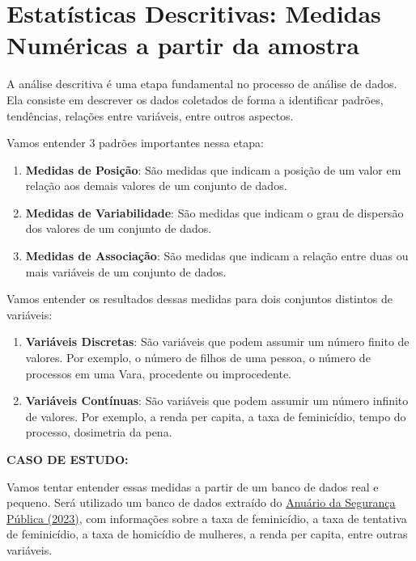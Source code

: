 \documentclass[
  letterpaper,
  DIV=11,
  numbers=noendperiod]{scrreprt}
\begin{document}
\section{Estatísticas Descritivas: Medidas Numéricas a partir da
amostra}\label{estatuxedsticas-descritivas-medidas-numuxe9ricas-a-partir-da-amostra}

A análise descritiva é uma etapa fundamental no processo de análise de
dados. Ela consiste em descrever os dados coletados de forma a
identificar padrões, tendências, relações entre variáveis, entre outros
aspectos.

Vamos entender 3 padrões importantes nessa etapa:

\begin{enumerate}
\def\labelenumi{\arabic{enumi}.}
\item
  \textbf{Medidas de Posição}: São medidas que indicam a posição de um
  valor em relação aos demais valores de um conjunto de dados.
\item
  \textbf{Medidas de Variabilidade}: São medidas que indicam o grau de
  dispersão dos valores de um conjunto de dados.
\item
  \textbf{Medidas de Associação}: São medidas que indicam a relação
  entre duas ou mais variáveis de um conjunto de dados.
\end{enumerate}

Vamos entender os resultados dessas medidas para dois conjuntos
distintos de variáveis:

\begin{enumerate}
\def\labelenumi{\arabic{enumi}.}
\item
  \textbf{Variáveis Discretas}: São variáveis que podem assumir um
  número finito de valores. Por exemplo, o número de filhos de uma
  pessoa, o número de processos em uma Vara, procedente ou improcedente.
\item
  \textbf{Variáveis Contínuas}: São variáveis que podem assumir um
  número infinito de valores. Por exemplo, a renda per capita, a taxa de
  feminicídio, tempo do processo, dosimetria da pena.
\end{enumerate}

\textbf{CASO DE ESTUDO:}

Vamos tentar entender essas medidas a partir de um banco de dados real e
pequeno. Será utilizado um banco de dados extraído do
\href{https://publicacoes.forumseguranca.org.br/items/6b3e3a1b-3bd2-40f7-b280-7419c8eb3b39}{Anuário
da Segurança Pública (2023)}, com informações sobre a taxa de
feminicídio, a taxa de tentativa de feminicídio, a taxa de homicídio de
mulheres, a renda per capita, entre outras variáveis.
\end{document}
